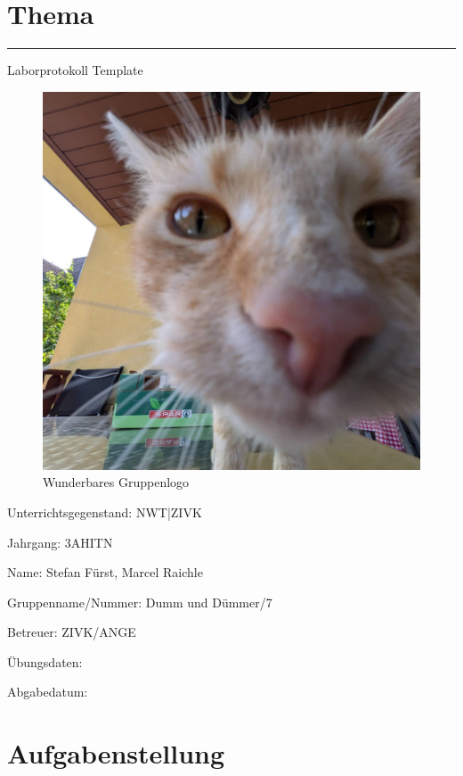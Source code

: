 \documentclass[a4paper]{article}
\begin{document}

\pagestyle{oida}
\section*{Thema}
\par\noindent\rule{\textwidth}{0.4pt}

Laborprotokoll
Template

\begin{figure}[h]
	\includegraphics[scale=0.3]{images/mika.jpeg}
	\caption{Wunderbares Gruppenlogo}
\end{figure}

\vspace*{\fill}
Unterrichtsgegenstand:	NWT|ZIVK

Jahrgang:	3AHITN

Name:	Stefan Fürst, Marcel Raichle

Gruppenname/Nummer: Dumm und Dümmer/7

Betreuer: 	ZIVK/ANGE

Übungsdaten:

Abgabedatum:


\newpage
\tableofcontents

\newpage

\section{Aufgabenstellung}
\end{document}
